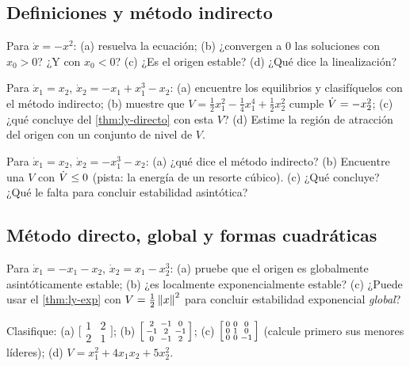 \subsection*{Definiciones y método indirecto}

\begin{problema}\label{prob:ly-unlado}
Para $\dot x=-x^2$: (a) resuelva la ecuación; (b) ¿convergen a $0$ las soluciones con $x_0>0$? ¿Y con $x_0<0$? (c) ¿Es el origen estable? (d) ¿Qué dice la linealización?
\end{problema}

\begin{problema}\label{prob:ly-duffing}
Para $\dot x_1=x_2$, $\dot x_2=-x_1+x_1^3-x_2$: (a) encuentre los equilibrios y clasifíquelos con el método indirecto; (b) muestre que $V=\tfrac12x_1^2-\tfrac14x_1^4+\tfrac12x_2^2$ cumple $\dot V=-x_2^2$; (c) ¿qué concluye del \cref{thm:ly-directo} con esta $V$? (d) Estime la región de atracción del origen con un conjunto de nivel de $V$.
\end{problema}

\begin{problema}\label{prob:ly-callan}
Para $\dot x_1=x_2$, $\dot x_2=-x_1^3-x_2$: (a) ¿qué dice el método indirecto? (b) Encuentre una $V$ con $\dot V\le0$ (pista: la energía de un resorte cúbico). (c) ¿Qué concluye? ¿Qué le falta para concluir estabilidad asintótica?
\end{problema}

\subsection*{Método directo, global y formas cuadráticas}

\begin{problema}[global]\label{prob:ly-global}
Para $\dot x_1=-x_1-x_2$, $\dot x_2=x_1-x_2^3$: (a) pruebe que el origen es globalmente asintóticamente estable; (b) ¿es localmente exponencialmente estable? (c) ¿Puede usar el \cref{thm:ly-exp} con $V=\tfrac12\left\lVert x\right\rVert^2$ para concluir estabilidad exponencial \emph{global}?
\end{problema}

\begin{problema}[clasificar]\label{prob:ly-clasificar}
Clasifique: (a) $\bigl[\begin{smallmatrix}1&2\\2&1\end{smallmatrix}\bigr]$; (b) $\Bigl[\begin{smallmatrix}2&-1&0\\-1&2&-1\\0&-1&2\end{smallmatrix}\Bigr]$; (c) $\Bigl[\begin{smallmatrix}0&0&0\\0&1&0\\0&0&-1\end{smallmatrix}\Bigr]$ (calcule primero sus menores líderes); (d) $V=x_1^2+4x_1x_2+5x_2^2$.
\end{problema}


